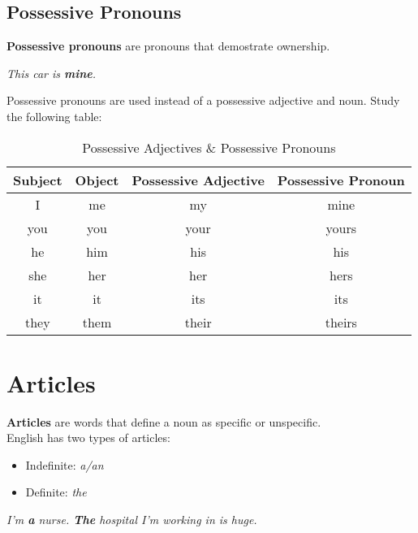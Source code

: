 \documentclass[10pt,a4paper]{article}
\begin{document}
\subsection{Possessive Pronouns}
\textbf{Possessive pronouns} are pronouns that demostrate ownership.
\begin{center}
\textit{This car is \textbf{mine}.}
\end{center}
Possessive pronouns are used instead of a possessive adjective and noun. Study the following table:
\begin{table}[h]
\begin{center}
\begin{tabular}{|c|c|c|c|}
		\hline
		\textbf{Subject} & \textbf{Object} & \textbf{Possessive Adjective} & \textbf{Possessive Pronoun}\\ \hline
		I & me & my & mine \\ \hline
		you & you & your & yours \\ \hline
		he & him & his & his \\ \hline
		she & her & her & hers \\ \hline
		it & it & its & its \\ \hline
		they & them & their & theirs\\ \hline
\end{tabular}
\end{center}
\caption{Possessive Adjectives \& Possessive Pronouns} \label{tab:nouns6}
\end{table}

\section{Articles}
\textbf{Articles} are words that define a noun as specific or unspecific.\\
English has two types of articles:
\begin{itemize}
		\item Indefinite: \textit{a/an}
		\item Definite: \textit{the}
\end{itemize}
\begin{center}
\textit{I'm \textbf{a} nurse. \textbf{The} hospital I'm working in is huge.}
\end{center}
\end{document}
